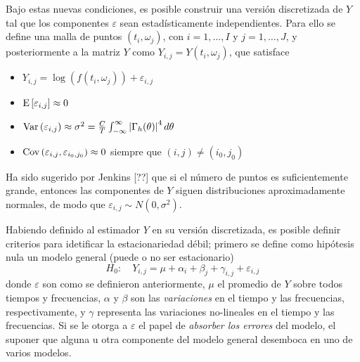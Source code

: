 Bajo estas nuevas condiciones, es posible construir una versión discretizada de $Y$ tal 
que los componentes $\varepsilon$ sean estadísticamente independientes. Para ello se define
una malla de puntos $(t_i,\omega_j)$, con $i = 1,\dots,I$ y  $j=1,\dots,J$, y posteriormente
a la matriz $Y$ como $Y_{i,j} = Y(t_i,\omega_j)$, que satisface
%
\begin{itemize}
\item $Y_{i,j} = \log\left(f(t_i,\omega_j)\right) + \varepsilon_{i,j}$
\item $\mathrm{E}\left[ \varepsilon_{i,j} \right] \approx 0$
\item $\mathrm{Var}\left( \varepsilon_{i,j} \right) \approx \sigma^{2} = 
\frac{C}{T} \int_{-\infty}^{\infty} \left| \Gamma_h(\theta) \right|^{4} d\theta$
\item $\mathrm{Cov}\left( \varepsilon_{i,j},\varepsilon_{i_0,j_0} \right) \approx 0$ siempre que $(i,j)\neq (i_0,j_0)$
\end{itemize}

Ha sido sugerido por Jenkins [??] que si el número de puntos es suficientemente grande, entonces
las componentes de $Y$ siguen distribuciones aproximadamente normales, de modo que
$\varepsilon_{i,j} \sim N(0,\sigma^{2})$.

Habiendo definido al estimador $Y$ en su versión discretizada, 
es posible definir criterios para idetificar la estacionariedad débil; primero se define 
como hipótesis nula
un modelo
general (puede o no ser estacionario)
%
\begin{equation*}
H_0 : \hspace{1em} Y_{i,j} = \mu + \alpha_i + \beta_j + \gamma_{i,j} + \varepsilon_{i,j}
\end{equation*}
%
donde $\varepsilon$ son como se definieron anteriormente,
$\mu$ el promedio de $Y$ sobre todos tiempos y frecuencias, $\alpha$ y $\beta$ son las 
\textit{variaciones} en el tiempo y las frecuencias, respectivamente, y $\gamma$ representa las
variaciones no-lineales en el tiempo y las frecuencias.
%
Si se le otorga a $\varepsilon$ el papel de \textit{absorber los errores} del modelo, el suponer
que alguna u otra componente del modelo general desemboca en uno de varios modelos.

